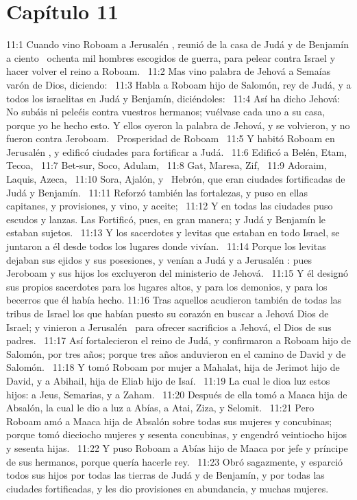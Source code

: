 										\section*{Capítulo 11}
											
											11:1 Cuando vino Roboam a Jerusalén , reunió de la casa de Judá y de Benjamín a ciento  ochenta mil hombres escogidos de guerra, para pelear contra Israel y hacer volver el reino a Roboam.  
											11:2 Mas vino palabra de Jehová a Semaías varón de Dios, diciendo:  
											11:3 Habla a Roboam hijo de Salomón, rey de Judá, y a todos los israelitas en Judá y Benjamín, diciéndoles:  
											11:4 Así ha dicho Jehová: No subáis ni peleéis contra vuestros hermanos; vuélvase cada uno a su casa, porque yo he hecho esto. Y ellos oyeron la palabra de Jehová, y se volvieron, y no fueron contra Jeroboam.  
											Prosperidad de Roboam  
											11:5 Y habitó Roboam en Jerusalén , y edificó ciudades para fortificar a Judá.  
											11:6 Edificó a Belén, Etam, Tecoa,  
											11:7 Bet-sur, Soco, Adulam,  
											11:8 Gat, Maresa, Zif,  
											11:9 Adoraim, Laquis, Azeca,  
											11:10 Sora, Ajalón, y  Hebrón, que eran ciudades fortificadas de Judá y Benjamín.  
											11:11 Reforzó también las fortalezas, y puso en ellas capitanes, y provisiones, y vino, y aceite;  
											11:12 Y en todas las ciudades puso escudos y lanzas. Las Fortificó, pues, en gran manera; y Judá y Benjamín le estaban sujetos.  
											11:13 Y los sacerdotes y levitas que estaban en todo Israel, se juntaron a él desde todos los lugares donde vivían.  
											11:14 Porque los levitas dejaban sus ejidos y sus posesiones, y venían a Judá y a Jerusalén : pues Jeroboam y sus hijos los excluyeron del ministerio de Jehová.  
											11:15 Y él designó sus propios sacerdotes para los lugares altos, y para los demonios, y para los becerros que él había hecho. 
											11:16 Tras aquellos acudieron también de todas las tribus de Israel los que habían puesto su corazón en buscar a Jehová Dios de Israel; y vinieron a Jerusalén  para ofrecer sacrificios a Jehová, el Dios de sus padres.  
											11:17 Así fortalecieron el reino de Judá, y confirmaron a Roboam hijo de Salomón, por tres años; porque tres años anduvieron en el camino de David y de Salomón.  
											11:18 Y tomó Roboam por mujer a Mahalat, hija de Jerimot hijo de David, y a Abihail, hija de Eliab hijo de Isaí.  
											11:19 La cual le dioa luz estos hijos: a Jeus, Semarias, y a Zaham.  
											11:20 Después de ella tomó a Maaca hija de Absalón, la cual le dio a luz a Abías, a Atai, Ziza, y Selomit.  
											11:21 Pero Roboam amó a Maaca hija de Absalón sobre todas sus mujeres y concubinas; porque tomó dieciocho mujeres y sesenta concubinas, y engendró veintiocho hijos y sesenta hijas.  
											11:22 Y puso Roboam a Abías hijo de Maaca por jefe y príncipe de sus hermanos, porque quería hacerle rey.  
											11:23 Obró sagazmente, y esparció todos sus hijos por todas las tierras de Judá y de Benjamín, y por todas las ciudades fortificadas, y les dio provisiones en abundancia, y muchas mujeres.  
